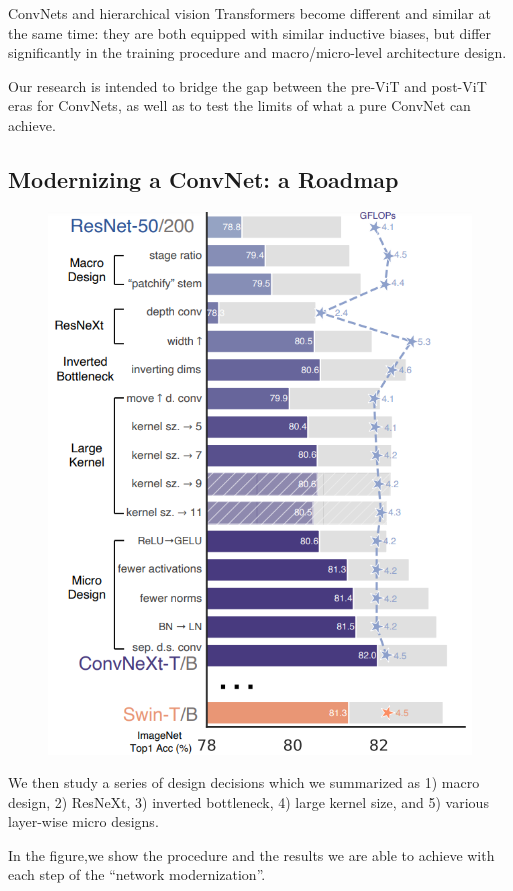 \documentclass[11pt]{article}
\begin{document}
ConvNets and hierarchical vision Transformers become different and similar at the same time: they are both equipped with similar inductive biases, but differ significantly in the training procedure and macro/micro-level architecture design.

Our research is intended to bridge the gap between the pre-ViT and post-ViT eras for ConvNets, as well as to test the limits of what a pure ConvNet can achieve.
\subsection{Modernizing a ConvNet: a Roadmap}
\begin{figure}[H]
	\centering
	\includegraphics[scale=0.5]{42}
\end{figure}
We then study a series of design decisions which we summarized as 1) macro design, 2) ResNeXt, 3) inverted bottleneck, 4) large kernel size, and 5) various layer-wise micro designs.

In the figure,we show the procedure and the results we are able to achieve with each step of the “network modernization”.
\end{document}
